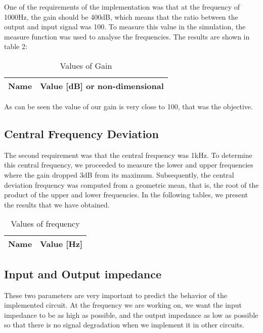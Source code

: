 One of the requirements of the implementation was that at the frequency of 1000Hz, the gain should be 400dB, which means that the ratio between the output and input signal was 100. To measure this value in the simulation, the measure function was used to analyse the frequencies. The results are shown in table 2: 

\begin{table}[H]
  \centering
  \begin{tabular}{|l|r|}
    \hline    
    {\bf Name} & {\bf Value [dB] or non-dimensional} \\ \hline
    
  \end{tabular}
  \caption{Values of Gain}
  \label{tab:r}
\end{table}

As can be seen the value of our gain is very close to 100, that was the objective.


\subsection{Central Frequency Deviation}

The second requirement was that the central frequency was 1kHz. To determine this central frequency, we proceeded to measure the lower and upper frequencies where the gain dropped 3dB from its maximum. Subsequently, the central deviation frequency was computed from a geometric mean, that is, the root of the product of the upper and lower frequencies. In the following tables, we present the results that we have obtained.

\begin{table}[H]
  \centering
  \begin{tabular}{|l|r|}
    \hline    
    {\bf Name} & {\bf Value [Hz] } \\ \hline
    
  \end{tabular}
  \caption{Values of frequency}
  \label{tab:r}
\end{table}


\subsection{Input and Output impedance}

These two parameters are very important to predict the behavior of the implemented circuit.
At the frequency we are working on, we want the input impedance to be as high as possible, and the output impedance as low as possible so that there is no signal degradation when we implement it in other circuits. 

